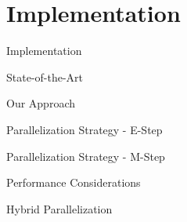 \section{Implementation}
    \begin{frame}{Implementation}
    \end{frame}

    \begin{frame}{State-of-the-Art}
    \end{frame}

    \begin{frame}{Our Approach}
    \end{frame}

    \begin{frame}{Parallelization Strategy - E-Step}
    \end{frame}

    \begin{frame}{Parallelization Strategy - M-Step}
    \end{frame}

    \begin{frame}{Performance Considerations}
    \end{frame}

    \begin{frame}{Hybrid Parallelization}
    \end{frame}